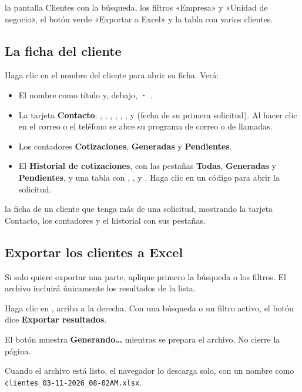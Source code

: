   {la pantalla Clientes con la búsqueda, los filtros «Empresa» y «Unidad de negocio», el botón
   verde «Exportar a Excel» y la tabla con varios clientes.}

\subsection{La ficha del cliente}

Haga clic en el nombre del cliente para abrir su ficha. Verá:

\begin{itemize}
  \item El nombre como título y, debajo, \textbf{ · }.
  \item La tarjeta \textbf{Contacto}: , , ,
        , , ,  y
         (fecha de su primera solicitud). Al hacer clic en el correo o el
        teléfono se abre su programa de correo o de llamadas.
  \item Los contadores \textbf{Cotizaciones}, \textbf{Generadas} y \textbf{Pendientes}.
  \item El \textbf{Historial de cotizaciones}, con las pestañas \textbf{Todas},
        \textbf{Generadas} y \textbf{Pendientes}, y una tabla con ,
        ,  y . Haga clic en un código para abrir la
        solicitud.
\end{itemize}

  {la ficha de un cliente que tenga más de una solicitud, mostrando la tarjeta Contacto, los
   contadores y el historial con sus pestañas.}

\subsection{Exportar los clientes a Excel}\label{sec:exportar}

\begin{pasos}
  \item Si solo quiere exportar una parte, aplique primero la búsqueda o los filtros. El archivo
        incluirá únicamente los resultados de la lista.
  \item Haga clic en , arriba a la
        derecha. Con una búsqueda o un filtro activo, el botón dice \textbf{Exportar resultados}.
  \item El botón muestra \textbf{Generando…} mientras se prepara el archivo. No cierre la
        página.
  \item Cuando el archivo está listo, el navegador lo descarga solo, con un nombre como
        \texttt{clientes\_03-11-2026\_08-02AM.xlsx}.
\end{pasos}

